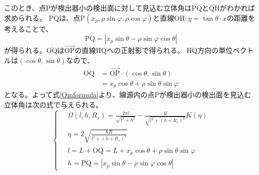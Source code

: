 \documentclass[11pt, titlepage, openany]{ltjsbook}
\begin{document}
このとき、点Pが検出器小の検出面に対して見込む立体角は$\mathrm{\overline{PQ}}$と$\mathrm{\overline{QH}}$がわかれば求められる。
$\mathrm{\overline{PQ}}$は、点$\mathrm{P}(x_p, \rho\sin\varphi, \rho\cos\varphi)$と直線$\mathrm{OH}:y=\tan \theta\cdot x$の距離を考えることで、
\begin{equation}
    \mathrm{\overline{PQ}} = \left| x_p \sin\theta - \rho\sin\varphi\cos\theta \right|
\end{equation}
が得られる。$\mathrm{\overline{OQ}}$は$\overrightarrow{\mathrm{OP}}$の直線HQへの正射影で得られる。
HQ方向の単位ベクトルは$(\cos\theta, \sin\theta)$なので、
\begin{align}
    \mathrm{\overline{OQ}} & = \overrightarrow{\mathrm{OP}} \cdot (\cos\theta, \sin\theta)\\
    & = x_p \cos\theta + \rho \sin\theta \sin\varphi
\end{align}
となる。よって式\ref{Omformula}より、線源内の点Pが検出器小の検出面を見込む立体角は次の式で与えられる。
\begin{equation}
\left\{ \,
    \begin{aligned}
    & \Omega(l, h, R_s) = \frac{2 \pi l}{\sqrt{l^2 + h^2}} - \frac{4l}{\sqrt{l^2 + (h + R_s)^2}} K(\eta)\\
    & \eta = 2 \sqrt{\frac{hR}{l^2 + (h + R_s)^2}} \\
    & l = L + \mathrm{\overline{OQ}} = L + x_p \cos\theta +\rho \sin\theta \sin\varphi \\
    & h = \mathrm{\overline{PQ}} = \left| x_p \sin\theta - \rho\sin\varphi\cos\theta \right|
    \end{aligned}
\right.
\label{Omformula2}
\end{equation}
\end{document}
